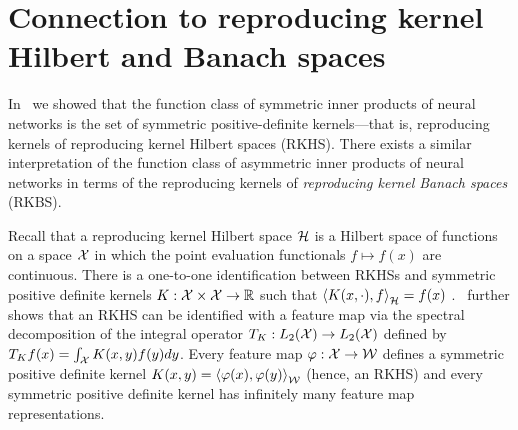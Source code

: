 \section{Connection to reproducing kernel Hilbert and Banach spaces}\label{sec:rkbs_asymmetric_relations}

In~ we showed that the function class of symmetric inner products of neural networks is the set of symmetric positive-definite kernels---that is, reproducing kernels of reproducing kernel Hilbert spaces (RKHS). There exists a similar interpretation of the function class of asymmetric inner products of neural networks in terms of the reproducing kernels of \textit{reproducing kernel Banach spaces} (RKBS).

Recall that a reproducing kernel Hilbert space ${\mathcal{H}}$ is a Hilbert space of functions on a space ${\mathcal{X}}$ in which the point evaluation functionals $f \mapsto f(x)$ are continuous. There is a one-to-one identification between RKHSs and symmetric positive definite kernels $K: {\mathcal{X}} \times {\mathcal{X}} \to \mathbb{R}$ such that $\left \langle K(x, \cdot), f \right\rangle_{\mathcal{H}} = f(x)$ \parencite{aronszajn1950theory}.~\parencite{mercerFunctionsPositive1909} further shows that an RKHS can be identified with a feature map via the spectral decomposition of the integral operator $T_K: L_2({\mathcal{X}}) \to L_2({\mathcal{X}})$ defined by $T_K f(x) = \int_{\mathcal{X}} K(x, y) f(y) dy$. Every feature map $\varphi: {\mathcal{X}} \to {\mathcal{W}}$ defines a symmetric positive definite kernel $K(x, y) = \left \langle \varphi(x), \varphi(y) \right\rangle_{\mathcal{W}}$ (hence, an RKHS) and every symmetric positive definite kernel has infinitely many feature map representations.

